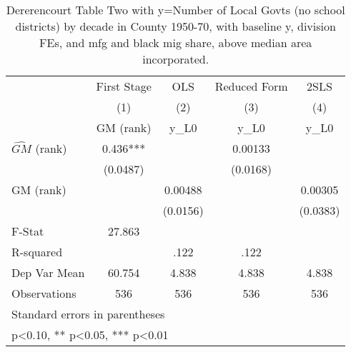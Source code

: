 \begin{table}[htbp]\centering
\def\sym#1{\ifmmode^{#1}\else\(^{#1}\)\fi}
\caption{Dererencourt Table Two with y=Number of Local Govts (no school districts) by decade in County 1950-70, with baseline y, division FEs, and mfg and black mig share, above median area incorporated.}
\begin{tabular}{l*{4}{c}}
\toprule
                    & First Stage   &         OLS   &Reduced Form   &        2SLS   \\
                    &\multicolumn{1}{c}{(1)}&\multicolumn{1}{c}{(2)}&\multicolumn{1}{c}{(3)}&\multicolumn{1}{c}{(4)}\\
                    &\multicolumn{1}{c}{GM  (rank)}&\multicolumn{1}{c}{y\_L0}&\multicolumn{1}{c}{y\_L0}&\multicolumn{1}{c}{y\_L0}\\
\midrule
$\hat{GM}$ (rank)   &       0.436***&               &     0.00133   &               \\
                    &    (0.0487)   &               &    (0.0168)   &               \\
\addlinespace
GM  (rank)          &               &     0.00488   &               &     0.00305   \\
                    &               &    (0.0156)   &               &    (0.0383)   \\
\midrule
F-Stat              &      27.863   &               &               &               \\
R-squared           &               &        .122   &        .122   &               \\
Dep Var Mean        &      60.754   &       4.838   &       4.838   &       4.838   \\
Observations        &         536   &         536   &         536   &         536   \\
\bottomrule
\multicolumn{5}{l}{\footnotesize Standard errors in parentheses}\\
\multicolumn{5}{l}{\footnotesize * p<0.10, ** p<0.05, *** p<0.01}\\
\end{tabular}
\end{table}
